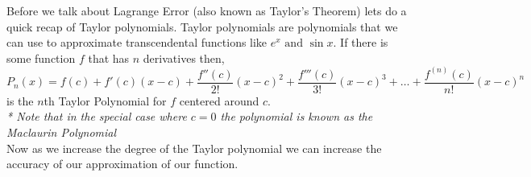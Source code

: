 \documentclass[addpoints]{exam}
\begin{document}
\vspace{1in}

\begin{tcolorbox}[title=TAYLOR POLYNOMIALS REVIEW ,colframe=black,sharp corners,colback=white,colbacktitle=white,coltitle=black]
   Before we talk about Lagrange Error (also known as Taylor's Theorem) lets do a quick recap of Taylor polynomials. Taylor polynomials are polynomials that we can use to approximate transcendental functions like $e^x \text{ and } \sin x$. If there is some function $f$ that has $n$ derivatives then,
   \[\displaystyle
   P_n(x) = f(c) + f'(c)\left(x-c\right) + \frac{f''(c)}{2\textbf{!}}\left(x-c\right)^2+ \frac{f'''(c)}{3\textbf{!}} \left(x-c\right)^3 + \dots + \frac{f^{\left(n\right)}(c)}{n\textbf{!}}\left(x-c\right)^n
   \]
    is the $n$th Taylor Polynomial for $f$ centered around $c$. \\
    \textit{* Note that in the special case where $c=0$ the polynomial is known as the Maclaurin Polynomial} \\
    Now as we increase the degree of the Taylor polynomial we can increase the accuracy of our approximation of our function. 

    \vspace{0.3in}

    \begin{minipage}{0.45\linewidth}
\end{minipage}
\end{tcolorbox}
\end{document}
